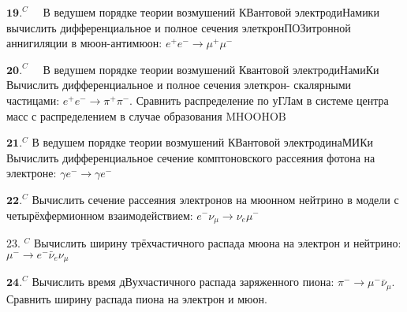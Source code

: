 \documentclass[a4paper,12pt]{article} %
\begin{document}
\begin{ttask}

$\mathbf{1 9 .}^{C} \quad$ В ведушем порядке теории возмушений КВантовой электродиНамики вычислить дифференциальное и полное сечения элеткронПОЗитронной аннигиляции в мюон-антимюон: $e^{+} e^{-} \rightarrow \mu^{+} \mu^{-}$


\end{ttask}



\begin{ttask}

$\mathbf{2 0 .}^{C} \quad$ В ведушем порядке теории возмушений Квантовой электродиНамиКи Вычислить дифференциальное и полное сечения элеткрон-
скалярными частицами: $e^{+} e^{-} \rightarrow \pi^{+} \pi^{-} .$ Сравнить распределение по уГЛам в системе центра масс с распределением в случае образования
$\mathrm{M} \mathrm{HOOHOB}$


\end{ttask}



\begin{ttask}

$\mathbf{2 1 .}^{C}$ В ведушем порядке теории возмушений КВантовой электродинаМИКи Вычислить дифференциальное сечение комптоновского рассеяния фотона на электроне: $\gamma e^{-} \rightarrow \gamma e^{-}$


\end{ttask}



\begin{ttask}

$\mathbf{2 2 .}^{C}$ Вычислить сечение рассеяния электронов на мюонном нейтрино
в модели с четырёхфермионном взаимодействием: $e^{-} \nu_{\mu} \rightarrow \nu_{e} \mu^{-}$


\end{ttask}



\begin{ttask}

23. $^{C}$ Вычислить ширину трёхчастичного распада мюона на электрон и нейтрино: $\mu^{-} \rightarrow e^{-} \bar{\nu}_{e} \nu_{\mu}$


\end{ttask}



\begin{ttask}

$\mathbf{2 4 .}^{C}$ Вычислить время дВухчастичного распада заряженного пиона:
$\pi^{-} \rightarrow \mu^{-} \bar{\nu}_{\mu} .$ Сравнить ширину распада пиона на электрон и мюон.



\end{ttask}
\end{document}
